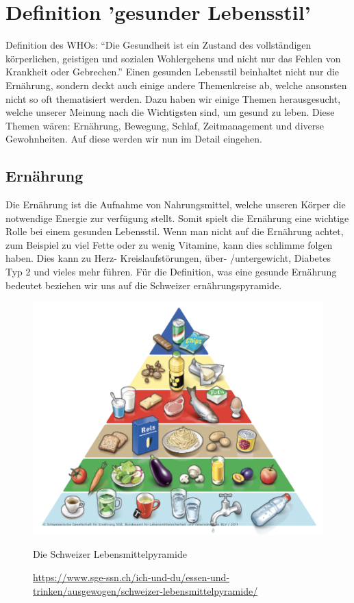 \chapter{Definition 'gesunder Lebensstil'}
Definition des WHOs: “Die Gesundheit ist ein Zustand des vollständigen körperlichen, geistigen und sozialen Wohlergehens und nicht nur das Fehlen von Krankheit oder Gebrechen.” \cite{gesundheit_definition}
Einen gesunden Lebensstil beinhaltet nicht nur die Ernährung, sondern deckt auch einige andere Themenkreise ab, welche ansonsten nicht so oft thematisiert werden. Dazu haben wir einige Themen herausgesucht, welche unserer Meinung nach die Wichtigsten sind, um gesund zu leben. Diese Themen wären: Ernährung, Bewegung, Schlaf, Zeitmanagement und diverse Gewohnheiten. Auf diese werden wir nun im Detail eingehen.
\section{Ernährung}
Die Ernährung ist die Aufnahme von Nahrungsmittel, welche unseren Körper die notwendige Energie zur verfügung stellt. Somit spielt die Ernährung eine wichtige Rolle bei einem gesunden Lebensstil. Wenn man nicht auf die Ernährung achtet, zum Beispiel zu viel Fette oder zu wenig Vitamine, kann dies schlimme folgen haben. Dies kann zu Herz- Kreislaufstörungen, über- /untergewicht, Diabetes Typ 2 und vieles mehr führen.
\newline
Für die Definition, was eine gesunde Ernährung bedeutet beziehen wir uns auf die Schweizer ernährungspyramide.
\begin{figure}[!ht]
  \centering
  \includegraphics[width=0.5\linewidth]{./images/lebensmittelpyramide.png}
  \caption{Die Schweizer Lebensmittelpyramide}
  \label{fig:pyramide}
  \caption*{\url{https://www.sge-ssn.ch/ich-und-du/essen-und-trinken/ausgewogen/schweizer-lebensmittelpyramide/}}
\end{figure}
